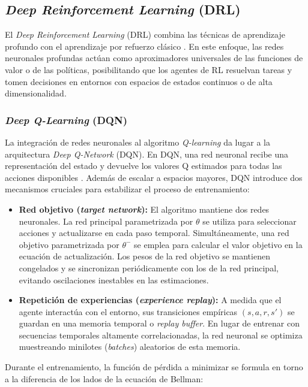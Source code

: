 \subsection{\textit{Deep Reinforcement Learning} (DRL)}

El \textit{Deep Reinforcement Learning} (DRL) combina las técnicas de aprendizaje profundo con el aprendizaje por refuerzo clásico \cite{mnih2015}. En este enfoque, las redes neuronales profundas actúan como aproximadores universales de las funciones de valor o de las políticas, posibilitando que los agentes de RL resuelvan tareas y tomen decisiones en entornos con espacios de estados continuos o de alta dimensionalidad.

\subsubsection{\textit{Deep Q-Learning} (DQN)}

La integración de redes neuronales al algoritmo \textit{Q-learning} da lugar a la arquitectura \textit{Deep Q-Network} (DQN). En DQN, una red neuronal recibe una representación del estado y devuelve los valores Q estimados para todas las acciones disponibles \cite{mnih2015}. Además de escalar a espacios mayores, DQN introduce dos mecanismos cruciales para estabilizar el proceso de entrenamiento:
\begin{itemize}
    \item \textbf{Red objetivo (\textit{target network}):} El algoritmo mantiene dos redes neuronales. La red principal parametrizada por \(\theta\) se utiliza para seleccionar acciones y actualizarse en cada paso temporal. Simultáneamente, una red objetivo parametrizada por \(\theta^-\) se emplea para calcular el valor objetivo en la ecuación de actualización. Los pesos de la red objetivo se mantienen congelados y se sincronizan periódicamente con los de la red principal, evitando oscilaciones inestables en las estimaciones.
    \item \textbf{Repetición de experiencias (\textit{experience replay}):} A medida que el agente interactúa con el entorno, sus transiciones empíricas \((s,a,r,s')\) se guardan en una memoria temporal o \textit{replay buffer}. En lugar de entrenar con secuencias temporales altamente correlacionadas, la red neuronal se optimiza muestreando minilotes (\textit{batches}) aleatorios de esta memoria.
\end{itemize}

Durante el entrenamiento, la función de pérdida a minimizar se formula en torno a la diferencia de los lados de la ecuación de Bellman:

